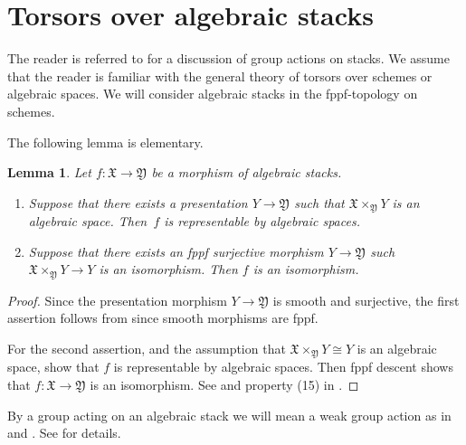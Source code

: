 \documentclass[12pt, final]{amsart}
\theoremstyle{remark}
\theoremstyle{definition}
\theoremstyle{plain}
\newtheorem{lemma}[example]{Lemma}
\newcommand{\fX}{{\mathfrak X}}
\newcommand{\fY}{{\mathfrak Y}}
\begin{document}

\section{Torsors over algebraic stacks}\label{sec:torsors}
The reader is referred to \cite{romagny:05} for a discussion of group actions on stacks. We assume that the reader is familiar with the general theory of torsors over schemes or algebraic spaces. 
We will consider algebraic stacks in the fppf-topology on schemes. 

The following lemma is elementary. 

\begin{lemma}\label{l:isomorphism-criteria-for-stacks}
    Let $f:\fX\to\fY $ be a morphism of algebraic stacks. 
    \begin{enumerate}
        \item Suppose that there exists a presentation $Y\to \fY$ such that $\fX\times_{\fY} Y $ is an algebraic space. Then~$f$ is representable by algebraic spaces.
        \item Suppose that there exists an fppf surjective morphism $Y\to \fY$ such $\fX\times_{\fY} Y \to Y$ is an isomorphism. Then $f$ is an isomorphism.
    \end{enumerate}
\end{lemma}

\begin{proof}
    Since the presentation morphism $Y\to \fY$ is smooth and surjective, the first assertion follows from 
    \cite[\href{https://stacks.math.columbia.edu/tag/04ZP}{04ZP}]{stacks-project} since smooth morphisms are fppf.
    
    For the second assertion, \cite[\href{https://stacks.math.columbia.edu/tag/04ZP}{04ZP}]{stacks-project} and the 
    assumption that $\fX\times_{\fY} Y\cong Y$ is an algebraic space, show that $f$ is representable by algebraic spaces.
    Then fppf descent shows that $f:\fX\to \fY$ is an isomorphism.
    See \cite[\href{https://stacks.math.columbia.edu/tag/04XD}{04XD}]{stacks-project} and property (15) in \cite[\href{https://stacks.math.columbia.edu/tag/04XB}{Section 04XB}]{stacks-project}.
\end{proof}

By a group acting on an algebraic stack we will mean a weak group action as in \cite{ginot} and \cite{romagny:05}. See  for details.
\end{document}
